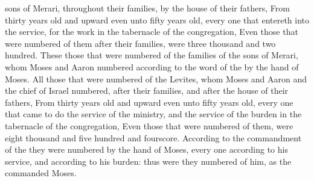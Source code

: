 {sons of
Merari, throughout their
families, by the
house of their
fathers,
From
thirty
years
old and
upward even unto
fifty
years
old, every one that
entereth into the
service, for the
work in the
tabernacle of the
congregation,
Even those that were
numbered of them after their
families, were
three
thousand and two
hundred.
These
{} those that were
numbered of the
families of the
sons of
Merari, whom
Moses and
Aaron
numbered according to the
word of the
{} by the
hand of
Moses.
All those that were
numbered of the
Levites, whom
Moses and
Aaron and the
chief of
Israel
numbered, after their
families, and after the
house of their
fathers,
From
thirty
years
old and
upward even unto
fifty
years
old, every one that
came to
do the service of the
ministry, and the
service of the
burden in the
tabernacle of the
congregation,
Even those that were
numbered of them, were
eight
thousand and
five
hundred and
fourscore.
According to the
commandment of the
{} they were
numbered by the
hand of
Moses,
every
one according to his
service, and according to his
burden: thus were they
numbered of him, as the
{}
commanded
Moses.

}
